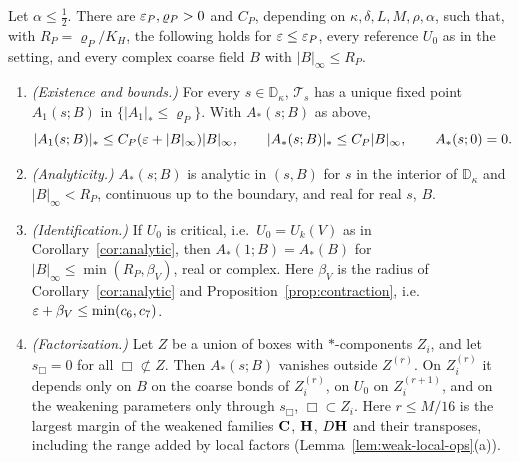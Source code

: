 \begin{theorem}\label{thm:weak-bg}
Let $\alpha\le\frac12$. There are $\varepsilon_P,\varrho_P>0$ and $C_P$, depending on $\kappa,\delta,L,M,\rho,\alpha$, such that, with $R_P=\varrho_P/K_H$, the following holds for $\varepsilon\le\varepsilon_P$, every reference $U_0$ as in the setting, and every complex coarse field $B$ with $|B|_\infty\le R_P$.
\begin{enumerate}[label=(\alph*)]
\item \emph{(Existence and bounds.)} For every $s\in\mathbb D_\kappa$, $\mathcal T_s$ has a unique fixed point $A_1(s;B)$ in $\{|A_1|_*\le\varrho_P\}$. With $A_*(s;B)$ as above,
\[
|A_1(s;B)|_*\le C_P(\varepsilon+|B|_\infty)|B|_\infty,\qquad|A_*(s;B)|_*\le C_P|B|_\infty,\qquad A_*(s;0)=0 .
\]
\item \emph{(Analyticity.)} $A_*(s;B)$ is analytic in $(s,B)$ for $s$ in the interior of $\mathbb D_\kappa$ and $|B|_\infty<R_P$, continuous up to the boundary, and real for real $s$, $B$.
\item \emph{(Identification.)} If $U_0$ is critical, i.e.\ $U_0=U_k(V)$ as in Corollary~\ref{cor:analytic}, then $A_*(1;B)=A_*(B)$ for $|B|_\infty\le\min(R_P,\beta_V)$, real or complex. Here $\beta_V$ is the radius of Corollary~\ref{cor:analytic} and Proposition~\ref{prop:contraction}, i.e.\ $\varepsilon+\beta_V\le\min(c_6,c_7)$.
\item \emph{(Factorization.)} Let $Z$ be a union of boxes with $*$-components $Z_i$, and let $s_\Box=0$ for all $\Box\not\subset Z$. Then $A_*(s;B)$ vanishes outside $Z^{(r)}$. On $Z_i^{(r)}$ it depends only on $B$ on the coarse bonds of $Z_i^{(r)}$, on $U_0$ on $Z_i^{(r+1)}$, and on the weakening parameters only through $s_\Box$, $\Box\subset Z_i$. Here $r\le M/16$ is the largest margin of the weakened families $\mathbf C$, $\mathbf H$, $D\mathbf H$ and their transposes, including the range added by local factors (Lemma~\ref{lem:weak-local-ops}(a)).
\end{enumerate}
\end{theorem}

